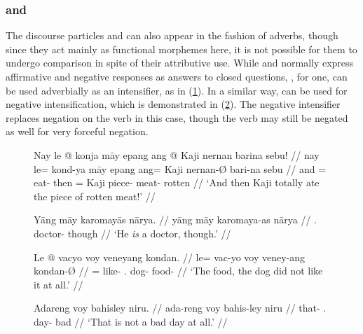 
\subsubsection{ and }
\label{subsubsec:maayvoy}

The discourse particles  and  can also
appear in the fashion of adverbs, though since they act mainly as functional
morphemes here, it is not possible for them to undergo comparison in spite of
their attributive use. While  and 
normally express affirmative and negative responses as answers to closed
questions, , for one, can be used adverbially as an
intensifier, as in (\ref{ex:maayintens}). In a similar way,  can
be used for negative intensification, which is demonstrated in 
(\ref{ex:voyintens}). The negative intensifier replaces negation on the verb in
this case, though the verb may still be negated as well for very forceful
negation.

\begin{figure}[h]
\pex\label{ex:maayintens}
\a\begingl
	\gla Nay le @ konja māy epang ang @ Kaji nernan barina sebu! //
	\glb nay le= kond-ya māy epang ang= Kaji nernan-Ø bari-na sebu //
	\glc and \PatTI{}= eat-\TsgM{} \Int{} then \Aarg{}= Kaji piece-\Top{} 
		meat-\Gen{} rotten //
	\glft `And then Kaji totally ate the piece of rotten meat!' //
\endgl

\a\begingl
	\gla Yāng māy karomayās nārya. //
	\glb yāng māy karomaya-as nārya //
	\glc \TsgM{}.\Aarg{} \Int{} doctor-\Parg{} though // 
	\glft `He \emph{is} a doctor, though.' //
\endgl
\xe
\end{figure}

\begin{figure}[h]
\pex\label{ex:voyintens}
\a\begingl
	\gla Le @ vacyo voy veneyang kondan. //
	\glb le= vac-yo voy veney-ang kondan-Ø //
	\glc \PatTI{}= like-\TsgN{} \Int{}.\Neg{} dog-\Aarg{} food-\Top{} //
	\glft `The food, the dog did not like it at all.' //
\endgl

\a\begingl
	\gla Adareng voy bahisley niru. //
	\glb ada-reng voy bahis-ley niru //
	\glc that-\AargI{} \Int{}.\Neg{} day-\PargI{} bad // 
	\glft `That is not a bad day at all.' //
\endgl
\xe
\end{figure}


